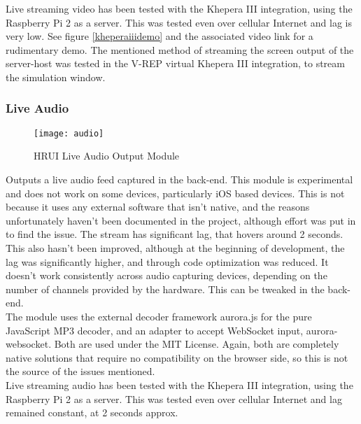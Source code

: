 Live streaming video has been tested with the Khepera III integration, using the Raspberry Pi 2 as a server. This was tested 
even over cellular Internet and lag is very low. See figure \ref{kheperaiiidemo} and the associated video link for a 
rudimentary demo. The mentioned method of streaming the screen output of the server-host was tested in the V-REP virtual 
Khepera III integration, to stream the simulation window.
\subsubsection{Live Audio} \label{liveaudio}
\begin{figure}[H]
\centering
\captionsetup{justification=centering}
\texttt{[image: audio]}
\caption{HRUI Live Audio Output Module}
\end{figure}
Outputs a live audio feed captured in the back-end. This module is experimental and does not work on some devices, 
particularly iOS based devices. This is not because it uses any external software that isn't native, and the reasons 
unfortunately haven't been documented in the project, although effort was put in to find the issue. The stream has 
significant lag, that hovers around 2 seconds. This also hasn't been improved, although at the beginning of development, the 
lag was significantly higher, and through code optimization was reduced. It doesn't work consistently across audio capturing 
devices, depending on the number of channels provided by the hardware. This can be tweaked in the back-end.\\

The module uses the external decoder framework aurora.js\cite{aurora15} for the pure JavaScript MP3 decoder, and an adapter 
to accept WebSocket input, aurora-websocket\cite{auroraws15}. Both are used under the MIT License. Again, both are completely 
native solutions that require no compatibility on the browser side, so this is not the source of the issues mentioned.\\

Live streaming audio has been tested with the Khepera III integration, using the Raspberry Pi 2 as a server. This was tested 
even over cellular Internet and lag remained constant, at 2 seconds approx.
